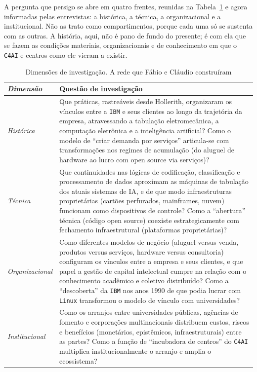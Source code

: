 A pergunta que persigo se abre em quatro frentes, reunidas na Tabela~\ref{tab:dimensoes_investigacao_cap3} e agora informadas pelas entrevistas: a histórica, a técnica, a organizacional e a institucional. Não as trato como compartimentos, porque cada uma só se sustenta com as outras. A história, aqui, não é pano de fundo do presente; é com ela que se fazem as condições materiais, organizacionais e de conhecimento em que o \texttt{C4AI} e centros como ele vieram a existir.

\begin{table}[h]
    \centering
    \caption{Dimensões de investigação. A rede que Fábio e Cláudio construíram}
    \label{tab:dimensoes_investigacao_cap3}
    \begin{tabular}{>{\itshape}m{2.8cm} m{11cm}}
        \hline
        Dimensão & Questão de investigação \\
        \hline
        Histórica & Que práticas, rastreáveis desde Hollerith, organizaram os vínculos entre a \texttt{IBM} e seus clientes ao longo da trajetória da empresa, atravessando a tabulação eletromecânica, a computação eletrônica e a inteligência artificial? Como o modelo de ``criar demanda por serviços'' articula-se com transformações nos regimes de acumulação (do aluguel de hardware ao lucro com open source via serviços)? \\
        \hline
        Técnica & Que continuidades nas lógicas de codificação, classificação e processamento de dados aproximam as máquinas de tabulação dos atuais sistemas de IA, e de que modo infraestruturas proprietárias (cartões perfurados, mainframes, nuvem) funcionam como dispositivos de controle? Como a ``abertura'' técnica (código open source) coexiste estrategicamente com fechamento infraestrutural (plataformas proprietárias)? \\
        \hline
        Organizacional & Como diferentes modelos de negócio (aluguel versus venda, produtos versus serviços, hardware versus consultoria) configuram os vínculos entre a empresa e seus clientes, e que papel a gestão de capital intelectual cumpre na relação com o conhecimento acadêmico e coletivo distribuído? Como a ``descoberta'' da \texttt{IBM} nos anos 1990 de que podia lucrar com \texttt{Linux} transformou o modelo de vínculo com universidades? \\
        \hline
        Institucional & Como os arranjos entre universidades públicas, agências de fomento e corporações multinacionais distribuem custos, riscos e benefícios (monetários, epistêmicos, infraestruturais) entre as partes? Como a função de ``incubadora de centros'' do \texttt{C4AI} multiplica institucionalmente o arranjo e amplia o ecossistema? \\
        \hline
    \end{tabular}
\end{table}

